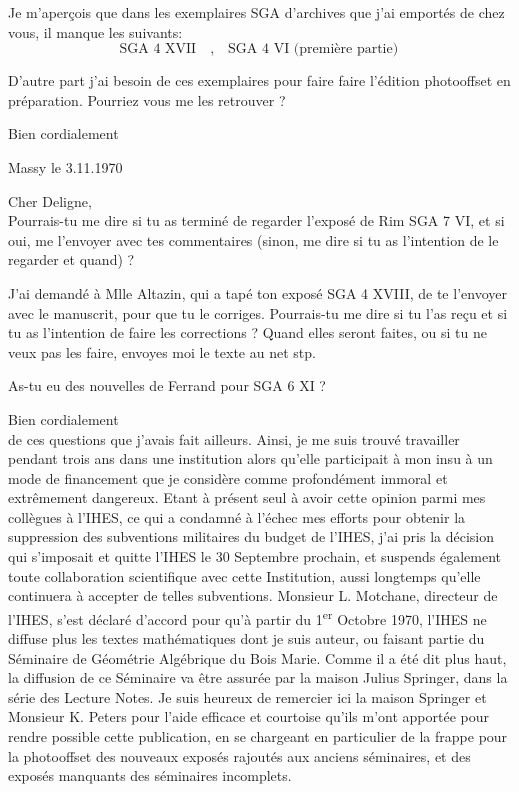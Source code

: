 Je m'aperçois que dans les exemplaires SGA d'archives que j'ai emportés de chez vous, il manque les suivants:
\[
\text{SGA 4 XVII}\quad,\quad\text{SGA 4 VI (première partie)}
\]

D'autre part j'ai besoin de ces exemplaires pour faire faire l'édition photooffset en préparation. Pourriez vous me les retrouver ?

Bien cordialement\\

\begin{flushright}
Massy le 3.11.1970\\
\end{flushright}
Cher Deligne,\\

Pourrais-tu me dire si tu as terminé de regarder l'exposé de Rim SGA 7 VI, et si oui, me l'envoyer avec tes commentaires (sinon, me dire si tu as l'intention de le regarder et quand) ?

J'ai demandé à Mlle Altazin, qui a tapé ton exposé SGA 4 XVIII, de te l'envoyer avec le manuscrit, pour que tu le corriges. Pourrais-tu me dire si tu l'as reçu et si tu as l'intention de faire les corrections ? Quand elles seront faites, ou si tu ne veux pas les faire, envoyes moi le texte au net stp.

As-tu eu des nouvelles de Ferrand pour SGA 6 XI ?

Bien cordialement\\

de ces questions que j'avais fait ailleurs. Ainsi, je me suis trouvé travailler pendant trois ans dans une institution alors qu'elle participait à mon insu à un mode de financement que je considère comme profondément immoral et extrêmement dangereux. Etant à présent seul à avoir cette opinion parmi mes collègues à l'IHES, ce qui a condamné à l'échec mes efforts pour obtenir la suppression des subventions militaires du budget de l'IHES, j'ai pris la décision qui s'imposait et quitte l'IHES le 30 Septembre prochain, et suspends également toute collaboration scientifique avec cette Institution, aussi longtemps qu'elle continuera à accepter de telles subventions. Monsieur L. Motchane, directeur de l'IHES, s'est déclaré d'accord pour qu'à partir du 1\textsuperscript{er} Octobre 1970, l'IHES ne diffuse plus les textes mathématiques dont je suis auteur, ou faisant partie du Séminaire de Géométrie Algébrique du Bois Marie. Comme il a été dit plus haut, la diffusion de ce Séminaire va être assurée par la maison Julius Springer, dans la série des Lecture Notes. Je suis heureux de remercier ici la maison Springer et Monsieur K. Peters pour l'aide efficace et courtoise qu'ils m'ont apportée pour rendre possible cette publication, en se chargeant en particulier de la frappe pour la photooffset des nouveaux exposés rajoutés aux anciens séminaires, et des exposés manquants des séminaires incomplets.

